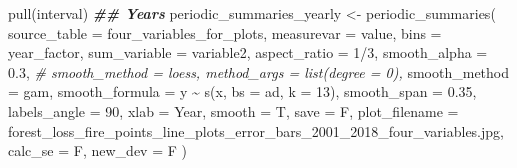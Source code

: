\documentclass[10pt,landscape,a3paper]{article}
\newenvironment{Shaded}{\begin{snugshade}}{\end{snugshade}}
\newcommand{\AttributeTok}[1]{\textcolor[rgb]{0.77,0.63,0.00}{#1}}
\newcommand{\CommentTok}[1]{\textcolor[rgb]{0.56,0.35,0.01}{\textit{#1}}}
\newcommand{\DecValTok}[1]{\textcolor[rgb]{0.00,0.00,0.81}{#1}}
\newcommand{\DocumentationTok}[1]{\textcolor[rgb]{0.56,0.35,0.01}{\textbf{\textit{#1}}}}
\newcommand{\FloatTok}[1]{\textcolor[rgb]{0.00,0.00,0.81}{#1}}
\newcommand{\FunctionTok}[1]{\textcolor[rgb]{0.00,0.00,0.00}{#1}}
\newcommand{\NormalTok}[1]{#1}
\newcommand{\OtherTok}[1]{\textcolor[rgb]{0.56,0.35,0.01}{#1}}
\newcommand{\SpecialCharTok}[1]{\textcolor[rgb]{0.00,0.00,0.00}{#1}}
\newcommand{\StringTok}[1]{\textcolor[rgb]{0.31,0.60,0.02}{#1}}
\begin{document}
\begin{Shaded}
\begin{Highlighting}[]
  \FunctionTok{pull}\NormalTok{(interval)}
\DocumentationTok{\#\# Years}
\NormalTok{periodic\_summaries\_yearly }\OtherTok{\textless{}{-}} \FunctionTok{periodic\_summaries}\NormalTok{(}
  \AttributeTok{source\_table =}\NormalTok{ four\_variables\_for\_plots, }\AttributeTok{measurevar =} \StringTok{\textquotesingle{}value\textquotesingle{}}\NormalTok{,}
  \AttributeTok{bins =} \StringTok{\textquotesingle{}year\_factor\textquotesingle{}}\NormalTok{, }\AttributeTok{sum\_variable =} \StringTok{\textquotesingle{}variable2\textquotesingle{}}\NormalTok{, }\AttributeTok{aspect\_ratio =} \DecValTok{1}\SpecialCharTok{/}\DecValTok{3}\NormalTok{, }\AttributeTok{smooth\_alpha =} \FloatTok{0.3}\NormalTok{,}
  \CommentTok{\# smooth\_method = \textquotesingle{}loess\textquotesingle{}, method\_args = list(degree = 0),}
  \AttributeTok{smooth\_method =} \StringTok{\textquotesingle{}gam\textquotesingle{}}\NormalTok{, }\AttributeTok{smooth\_formula =}\NormalTok{ y }\SpecialCharTok{\textasciitilde{}} \FunctionTok{s}\NormalTok{(x, }\AttributeTok{bs =} \StringTok{\textquotesingle{}ad\textquotesingle{}}\NormalTok{, }\AttributeTok{k =} \DecValTok{13}\NormalTok{),}
  \AttributeTok{smooth\_span =} \FloatTok{0.35}\NormalTok{, }\AttributeTok{labels\_angle =} \DecValTok{90}\NormalTok{, }\AttributeTok{xlab =} \StringTok{\textquotesingle{}Year\textquotesingle{}}\NormalTok{, }\AttributeTok{smooth =}\NormalTok{ T, }\AttributeTok{save =}\NormalTok{ F,}
  \AttributeTok{plot\_filename =} \StringTok{\textquotesingle{}forest\_loss\_fire\_points\_line\_plots\_error\_bars\_2001\_2018\_four\_variables.jpg\textquotesingle{}}\NormalTok{,}
  \AttributeTok{calc\_se =}\NormalTok{ F, }\AttributeTok{new\_dev =}\NormalTok{ F}
\NormalTok{)}
\end{Highlighting}
\end{Shaded}
\end{document}
